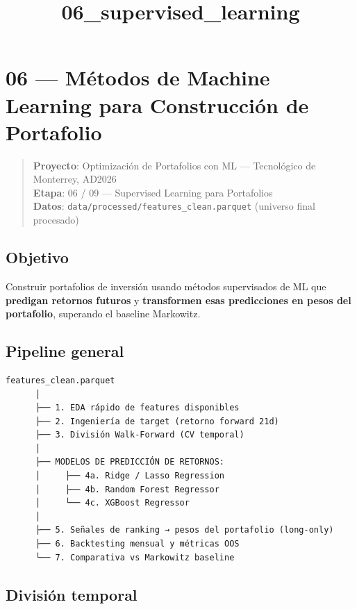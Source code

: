 \documentclass[11pt]{article}
\title{06\_supervised\_learning}
\begin{document}
    
    \maketitle
    
    

    
    \section{06 --- Métodos de Machine Learning para Construcción de
Portafolio}\label{muxe9todos-de-machine-learning-para-construcciuxf3n-de-portafolio}

\begin{quote}
\textbf{Proyecto}: Optimización de Portafolios con ML --- Tecnológico de
Monterrey, AD2026\\
\textbf{Etapa}: 06 / 09 --- Supervised Learning para Portafolios\\
\textbf{Datos}: \texttt{data/processed/features\_clean.parquet}
(universo final procesado)
\end{quote}

\subsection{Objetivo}\label{objetivo}

Construir portafolios de inversión usando métodos supervisados de ML que
\textbf{predigan retornos futuros} y \textbf{transformen esas
predicciones en pesos del portafolio}, superando el baseline Markowitz.

\subsection{Pipeline general}\label{pipeline-general}

\begin{verbatim}
features_clean.parquet
      │
      ├── 1. EDA rápido de features disponibles
      ├── 2. Ingeniería de target (retorno forward 21d)
      ├── 3. División Walk-Forward (CV temporal)
      │
      ├── MODELOS DE PREDICCIÓN DE RETORNOS:
      │     ├── 4a. Ridge / Lasso Regression
      │     ├── 4b. Random Forest Regressor
      │     └── 4c. XGBoost Regressor
      │
      ├── 5. Señales de ranking → pesos del portafolio (long-only)
      ├── 6. Backtesting mensual y métricas OOS
      └── 7. Comparativa vs Markowitz baseline
\end{verbatim}

\subsection{División temporal}\label{divisiuxf3n-temporal}
\end{document}
